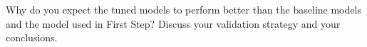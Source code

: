 \documentclass[11pt]{article}
\begin{document}
Why do you expect the tuned models to perform better than the baseline models and the model used in First Step? Discuss your validation strategy and your conclusions.


  




 
\end{document}
